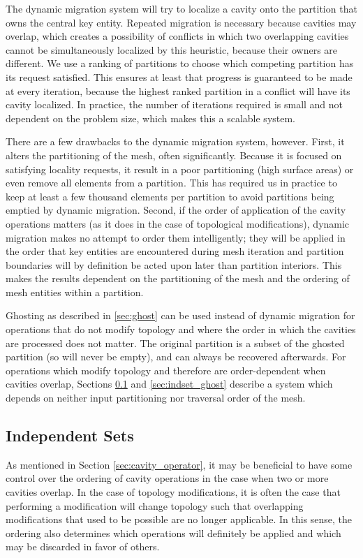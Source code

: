 The dynamic migration system will try to localize a cavity onto the
partition that owns the central key entity.
Repeated migration is necessary because cavities may overlap, which creates
a possibility of conflicts in which two overlapping cavities cannot be simultaneously
localized by this heuristic, because their owners are different.
We use a ranking of partitions to choose which competing partition
has its request satisfied.
This ensures at least that progress is guaranteed to be made at every iteration,
because the highest ranked partition in a conflict will have its cavity localized.
In practice, the number of iterations required is small and not dependent
on the problem size, which makes this a scalable system.

There are a few drawbacks to the dynamic migration system, however.
First, it alters the partitioning of the mesh, often significantly.
Because it is focused on satisfying locality requests, it result in
a poor partitioning (high surface areas) or even remove all elements
from a partition.
This has required us in practice to keep at least a few thousand
elements per partition to avoid partitions being emptied by dynamic migration.
Second, if the order of application of the cavity operations matters
(as it does in the case of topological modifications), dynamic migration
makes no attempt to order them intelligently; they will be applied
in the order that key entities are encountered during mesh iteration
and partition boundaries will by definition be acted upon later than
partition interiors.
This makes the results dependent on the partitioning of the mesh
and the ordering of mesh entities within a partition.

Ghosting as described in \ref{sec:ghost} can be used instead of dynamic
migration for operations that do not modify topology and
where the order in which the cavities
are processed does not matter.
The original partition is a subset of the ghosted partition
(so will never be empty), and can always be recovered afterwards.
For operations which modify topology and therefore are order-dependent
when cavities overlap,
Sections \ref{sec:indset} and \ref{sec:indset_ghost} describe a system
which depends on neither input partitioning nor traversal order of the mesh.

\subsection{Independent Sets}
\label{sec:indset}

As mentioned in Section \ref{sec:cavity_operator}, it may be beneficial
to have some control over the ordering of cavity operations in the
case when two or more cavities overlap.
In the case of topology modifications, it is often the case that
performing a modification will change topology such that overlapping
modifications that used to be possible are no longer applicable.
In this sense, the ordering also determines which operations will
definitely be applied and which may be discarded in favor of others.

